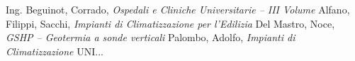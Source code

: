 \begin{thebibliography}{9}
	Ing. Beguinot, Corrado, \emph{Ospedali e Cliniche Universitarie -- III Volume}
	Alfano, Filippi, Sacchi, \emph{Impianti di Climatizzazione per l'Edilizia}
	Del Mastro, Noce, \emph{GSHP -- Geotermia a sonde verticali}
	Palombo, Adolfo, \emph{Impianti di Climatizzazione}
	 UNI...
\end{thebibliography}